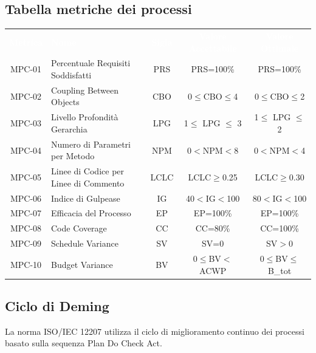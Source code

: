 \newpage
\subsection{Tabella metriche dei processi}
    \renewcommand{\arraystretch}{1.5}
    \begin{longtable}{ c C{4cm} c c c}
    \textcolor{white}{\textbf{Metrica}} & \textcolor{white}{\textbf{Nome}} & \textcolor{white}{\textbf{Sigla}} & \textcolor{white}{\textbf{Valore Accettabile}} & \textcolor{white}{\textbf{Valore Ottimale}}\\
    MPC-01 & Percentuale Requisiti Soddisfatti & PRS & PRS=100\% & PRS=100\% \\
    MPC-02 & Coupling Between Objects & CBO & 0$\leq$CBO$\leq$4 & 0$\leq$CBO$\leq$2 \\
    MPC-03 & Livello Profondità Gerarchia & LPG &  1$\leq$ LPG $\leq$ 3 &  1$\leq$ LPG $\leq$ 2\\
    MPC-04 & Numero di Parametri per Metodo & NPM & 0$<$NPM$<$8 & 0$<$NPM$<$4 \\
    MPC-05 & Linee di Codice per Linee di Commento & LCLC & LCLC$\geq$0.25 & LCLC$\geq$0.30 \\
    MPC-06 & Indice di Gulpease & IG & 40$<$IG$<$100 & 80$<$IG$<$100 \\
    MPC-07 & Efficacia del Processo & EP & EP=100\% & EP=100\%  \\
    MPC-08 & Code Coverage & CC & CC=80\% & CC=100\%  \\
    MPC-09 & Schedule Variance & SV & SV=0 & SV$>$0  \\	
    MPC-10 & Budget Variance & BV & 0$\leq$BV$<$ACWP  & 0$\leq$BV$\leq$B_tot  \\	

    \end{longtable}

\subsection{Ciclo di Deming}
    La norma ISO/IEC 12207 utilizza il ciclo di miglioramento continuo dei processi basato sulla sequenza Plan Do Check Act.

